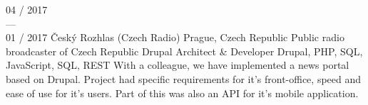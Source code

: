 \documentclass[]{friggeri-cv} %
\begin{document}
\begin{entrylist}
{        }
        \job
        {04 / 2017 \\ --- \\ 01 / 2017}
        {Český Rozhlas (Czech Radio)}
        {Prague, Czech Republic}
        {Public radio broadcaster of Czech Republic}
        {
            \position
            {Drupal Architect \& Developer}
            {Drupal, PHP, SQL, JavaScript, SQL, REST}
            {
                With a colleague, we have implemented a news portal based on Drupal. Project had specific requirements for
            it's front-office, speed and ease of use for it's users. Part of this was also an API for it's mobile application.
            }%
        }


\end{entrylist}
\end{document}
